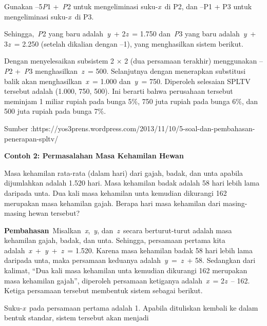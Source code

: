 \documentclass[11pt,fleqn]{book} %
\begin{document}
\begin{myEnumerate}
\begin{itemize}
\noindent 

\noindent 

\noindent Gunakan --5\textit{P}1 +~\textit{P}2 untuk mengeliminasi suku-\textit{x}~di P2, dan --P1 + P3 untuk mengeliminasi suku-\textit{x}~di P3.

\noindent 

\noindent Sehingga,~\textit{P}2 yang baru adalah~\textit{y}~+ 2\textit{z}~= 1.750 dan~\textit{P}3 yang baru adalah~\textit{y}~+ 3\textit{z}~= 2.250 (setelah dikalian dengan --1), yang menghasilkan sistem berikut.

\noindent 

\noindent 

\noindent Dengan menyelesaikan subsistem 2 $\times$ 2 (dua persamaan terakhir) menggunakan --\textit{P}2 +~\textit{P}3 menghasilkan~\textit{z}~= 500. Selanjutnya dengan menerapkan substitusi balik akan menghasilkan~\textit{x}~= 1.000 dan~\textit{y}~= 750. Diperoleh selesaian SPLTV tersebut adalah (1.000, 750, 500). Ini berarti bahwa perusahaan tersebut meminjam 1 miliar rupiah pada bunga 5\%, 750 juta rupiah pada bunga 6\%, dan 500 juta rupiah pada bunga 7\%.

\noindent Sumber :https://yos3prens.wordpress.com/2013/11/10/5-soal-dan-pembahasan-penerapan-spltv/

\noindent \textbf{}

\noindent \textbf{Contoh 2: Permasalahan Masa Kehamilan Hewan}

\noindent Masa kehamilan rata-rata (dalam hari) dari gajah, badak, dan unta apabila dijumlahkan adalah 1.520 hari. Masa kehamilan badak adalah 58 hari lebih lama daripada unta. Dua kali masa kehamilan unta kemudian dikurangi 162 merupakan masa kehamilan gajah. Berapa hari masa kehamilan dari masing-masing hewan tersebut?

\noindent \textbf{}

\noindent \textbf{Pembahasan}~Misalkan~\textit{x},~\textit{y}, dan~\textit{z}~secara berturut-turut adalah masa kehamilan gajah, badak, dan unta. Sehingga, persamaan pertama kita adalah~\textit{x}~+~\textit{y}~+~\textit{z}~= 1.520. Karena masa kehamilan badak 58 hari lebih lama daripada unta, maka persamaan keduanya adalah~\textit{y}~=~\textit{z}~+ 58. Sedangkan dari kalimat, ``Dua kali masa kehamilan unta kemudian dikurangi 162 merupakan masa kehamilan gajah'', diperoleh persamaan ketiganya adalah~\textit{x}~= 2\textit{z}~-- 162. Ketiga persamaan tersebut membentuk sistem sebagai berikut.

\noindent Suku-\textit{x}~pada persamaan pertama adalah 1. Apabila dituliskan kembali ke dalam bentuk standar, sistem tersebut akan menjadi


\end{itemize}
\end{myEnumerate}
\end{document}
